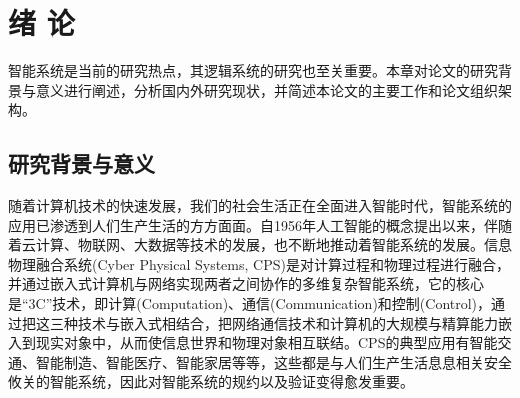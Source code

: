 \chapter{绪\hskip 0.4cm 论}
\label{chap1}
智能系统是当前的研究热点，其逻辑系统的研究也至关重要。本章对论文的研究背景与意义进行阐述，分析国内外研究现状，并简述本论文的主要工作和论文组织架构。

\section{研究背景与意义}



随着计算机技术的快速发展，我们的社会生活正在全面进入智能时代，智能系统的应用已渗透到人们生产生活的方方面面。自1956年人工智能的概念提出以来，伴随着云计算、物联网、大数据等技术的发展，也不断地推动着智能系统的发展。信息物理融合系统(Cyber Physical Systems, CPS)是对计算过程和物理过程进行融合，并通过嵌入式计算机与网络实现两者之间协作的多维复杂智能系统，它的核心是“3C”技术，即计算(Computation)、通信(Communication)和控制(Control)，通过把这三种技术与嵌入式相结合，把网络通信技术和计算机的大规模与精算能力嵌入到现实对象中，从而使信息世界和物理对象相互联结。CPS的典型应用有智能交通、智能制造、智能医疗、智能家居等等，这些都是与人们生产生活息息相关安全攸关的智能系统，因此对智能系统的规约以及验证变得愈发重要。


